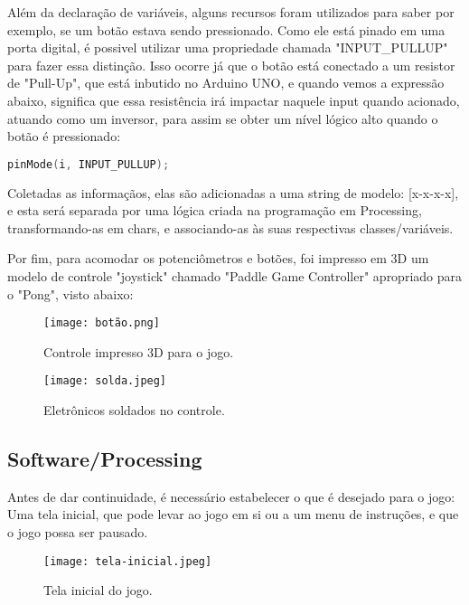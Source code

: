 	Além da declaração de variáveis, alguns recursos foram utilizados para saber por exemplo, se um botão estava sendo pressionado. Como ele está pinado em uma porta digital, é possivel utilizar uma propriedade chamada "INPUT\_PULLUP"	para fazer essa distinção. Isso ocorre já que o botão está conectado a um resistor de "Pull-Up", que está inbutido no Arduino UNO, e quando vemos a expressão abaixo, significa que essa resistência irá impactar naquele input quando acionado, atuando como um inversor, para assim se obter um nível lógico alto quando o botão é pressionado:

\begin{lstlisting}[language=C]
pinMode(i, INPUT_PULLUP);
\end{lstlisting}

	Coletadas as informaçãos, elas são adicionadas a uma string de modelo: [x-x-x-x], e esta será separada por uma lógica criada na programação em Processing, transformando-as em chars, e associando-as às suas respectivas classes/variáveis.

	Por fim, para acomodar os potenciômetros e botões, foi impresso em 3D um modelo de controle "joystick" chamado "Paddle Game Controller" apropriado para o "Pong", visto abaixo:

\begin{figure}[htbp]
     \centerline{
        \texttt{[image: botão.png]}
        }
     \caption{Controle impresso 3D para o jogo.}
     \label{fig}
    \end{figure}

\begin{figure}[htbp]
     \centerline{
        \texttt{[image: solda.jpeg]}
        }
     \caption{Eletrônicos soldados no controle.}
     \label{fig}
    \end{figure}

	

\subsection{Software/Processing}

	Antes de dar continuidade, é necessário estabelecer o que é desejado para o jogo: Uma tela inicial, que pode levar ao jogo em si ou a um menu de instruções, e que o jogo possa ser pausado.
	

\begin{figure}[htbp]
     \centerline{
        \texttt{[image: tela-inicial.jpeg]}
        }
     \caption{Tela inicial do jogo.}
     \label{fig}
    \end{figure}





